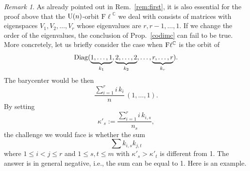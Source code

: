 \documentclass[12pt]{amsart}
\theoremstyle{definition}
\theoremstyle{remark}
\newtheorem{rem}[thm]{Remark}
\newcommand{\CC}{\mathbb C}
\newcommand{\Fl}{{\mathrm{F\ell}}}
\begin{document}
 \begin{rem} \label{rem:second} As already pointed out in Rem.~\ref{rem:first}, it is also essential for the proof above that the 
 ${\rm U}(n)$-orbit $\Fl^\CC$ we deal with consists of matrices with eigenspaces $V_1, V_2, \ldots, V_r$ whose eigenvalues are  
 $r, r-1, \ldots, 1$. If we change the order of the eigenvalues, the conclusion of Prop.~\ref{codimc} can fail to be true. 
More concretely, let us briefly consider the case when  ${\rm F}\ell^\CC$ is the orbit of  $${\rm Diag} (\underbrace{1, \dots, 1}_{k_1}, \underbrace{2, \dots, 2}_{k_2}, \dots,\underbrace{r, \dots, r}_{k_r}).$$   The barycenter would be then $$\frac{\sum_{i=1}^r i\, k_i}{n}\,(1,\dots,1).$$ By setting $$\kappa'_s := \frac{\sum_{i=1}^r i\,k_{i,s}}{n_s},$$ the challenge we would face is whether the sum $$\sum k_{i,s} k_{j,t}$$ where $1\le i <j \le r$ and $1\le s,t\le m$ with $\kappa'_s>\kappa'_t$ is different from 1.  The answer is in general negative, i.e., the sum can be equal to 1.
 Here is an example. 
 

\end{rem}
\end{document}

